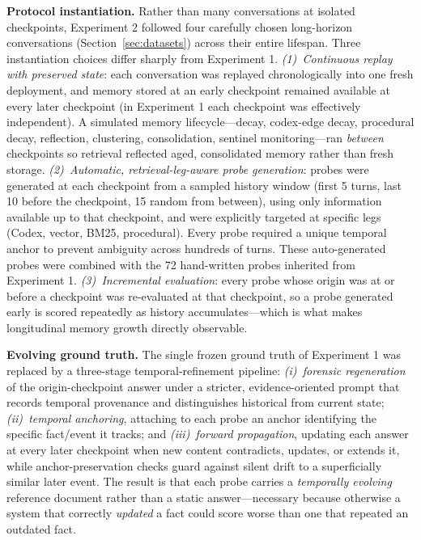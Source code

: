 \documentclass[11pt,a4paper]{article}
\begin{document}
\textbf{Protocol instantiation.} Rather than many conversations at isolated checkpoints, Experiment 2 followed four carefully chosen long-horizon conversations (Section~\ref{sec:datasets}) across their entire lifespan. Three instantiation choices differ sharply from Experiment 1. \emph{(1)~Continuous replay with preserved state}: each conversation was replayed chronologically into one fresh deployment, and memory stored at an early checkpoint remained available at every later checkpoint (in Experiment 1 each checkpoint was effectively independent). A simulated memory lifecycle---decay, codex-edge decay, procedural decay, reflection, clustering, consolidation, sentinel monitoring---ran \emph{between} checkpoints so retrieval reflected aged, consolidated memory rather than fresh storage. \emph{(2)~Automatic, retrieval-leg-aware probe generation}: probes were generated at each checkpoint from a sampled history window (first 5 turns, last 10 before the checkpoint, 15 random from between), using only information available up to that checkpoint, and were explicitly targeted at specific legs (Codex, vector, BM25, procedural). Every probe required a unique temporal anchor to prevent ambiguity across hundreds of turns. These auto-generated probes were combined with the 72 hand-written probes inherited from Experiment 1. \emph{(3)~Incremental evaluation}: every probe whose origin was at or before a checkpoint was re-evaluated at that checkpoint, so a probe generated early is scored repeatedly as history accumulates---which is what makes longitudinal memory growth directly observable.

\textbf{Evolving ground truth.} The single frozen ground truth of Experiment 1 was replaced by a three-stage temporal-refinement pipeline: \emph{(i)~forensic regeneration} of the origin-checkpoint answer under a stricter, evidence-oriented prompt that records temporal provenance and distinguishes historical from current state; \emph{(ii)~temporal anchoring}, attaching to each probe an anchor identifying the specific fact/event it tracks; and \emph{(iii)~forward propagation}, updating each answer at every later checkpoint when new content contradicts, updates, or extends it, while anchor-preservation checks guard against silent drift to a superficially similar later event. The result is that each probe carries a \emph{temporally evolving} reference document rather than a static answer---necessary because otherwise a system that correctly \emph{updated} a fact could score worse than one that repeated an outdated fact.
\end{document}
